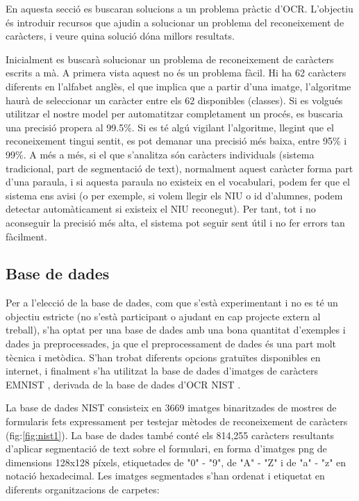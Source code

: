 \documentclass[12pt, spanish]{article}
\begin{document}
En aquesta secció es buscaran solucions a un problema pràctic d'OCR. L'objectiu és introduir recursos que ajudin a solucionar un problema del reconeixement de caràcters, i veure quina solució dóna millors resultats. 

Inicialment es buscarà solucionar un problema de reconeixement de caràcters escrits a mà. A primera vista aquest no és un problema fàcil. Hi ha 62 caràcters diferents en l'alfabet anglès, el que implica que a partir d'una imatge, l'algoritme haurà de seleccionar un caràcter entre els 62 disponibles (classes). Si es volgués utilitzar el nostre model per automatitzar completament un procés, es buscaria una precisió propera al 99.5\%. Si es té algú vigilant l'algoritme, llegint que el reconeixement tingui sentit, es pot demanar una precisió més baixa, entre 95\% i 99\%. A més a més, si el que s'analitza són caràcters individuals (sistema tradicional, part de segmentació de text), normalment aquest caràcter forma part d'una paraula, i si aquesta paraula no existeix en el vocabulari, podem fer que el sistema ens avisi (o per exemple, si volem llegir els NIU o id d'alumnes, podem detectar automàticament si existeix el NIU reconegut). Per tant, tot i no aconseguir la precisió més alta, el sistema pot seguir sent útil i no fer errors tan fàcilment. 

\subsection{Base de dades}

Per a l'elecció de la base de dades, com que s'està experimentant i no es té un objectiu estricte (no s'està participant o ajudant en cap projecte extern al treball), s'ha optat per una base de dades amb una bona quantitat d'exemples i dades ja preprocessades, ja que el preprocessament de dades és una part molt tècnica i metòdica. S'han trobat diferents opcions gratuïtes disponibles en internet, i finalment s'ha utilitzat la base de dades d'imatges de caràcters EMNIST \cite{EMNIST}, derivada de la base de dades d'OCR NIST \cite{watson1992nist}.

La base de dades NIST consisteix en 3669 imatges binaritzades de mostres de formularis fets expressament per testejar mètodes de reconeixement de caràcters (fig:\ref{fig:nist1}). La base de dades també conté els 814,255 caràcters resultants d'aplicar segmentació de text sobre el formulari, en forma d'imatges png de dimensions 128x128 píxels, etiquetades de "0" - "9", de "A" - "Z" i de "a" - "z" en notació hexadecimal. Les imatges segmentades s'han ordenat i etiquetat en diferents organitzacions de carpetes:
\end{document}
